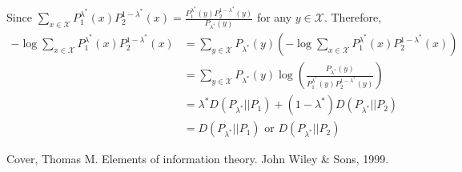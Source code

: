 \documentclass{article}
\begin{document}
Since $\sum_{x\in \mathcal{X}} P_1^{\lambda^*}(x)  P_2^{1-\lambda^*}(x) = \frac{P_1^{\lambda^*}(y)P_2^{1-\lambda^*}(y)}
{P_{\lambda^*}(y)}$ for any $y\in \mathcal{X}$. Therefore,
\begin{align*}
-\log \sum_{x\in \mathcal{X}} P_1^{\lambda^*}(x)  P_2^{1-\lambda^*}(x) &= \sum_{y \in \mathcal{X}} P_{\lambda^*}(y) \left(-\log \sum_{x\in \mathcal{X}} P_1^{\lambda^*}(x)  P_2^{1-\lambda^*}(x) \right)\\
& = \sum_{y \in \mathcal{X}} P_{\lambda^*}(y) \log\left(\frac{P_{\lambda^*}(y)}{P_1^{\lambda^*}(y)P_2^{1-\lambda^*}(y)}\right) \\
& = \lambda^* D(P_{\lambda^*} || P_1) + (1-\lambda^*) D(P_{\lambda^*} || P_2) \\
& = D(P_{\lambda^*} || P_1) \textrm{ or } D(P_{\lambda^*} || P_2)
\end{align*}
\begin{thebibliography}{9}
	 Cover, Thomas M. Elements of information theory. John Wiley \& Sons, 1999.
\end{thebibliography}
\end{document}
